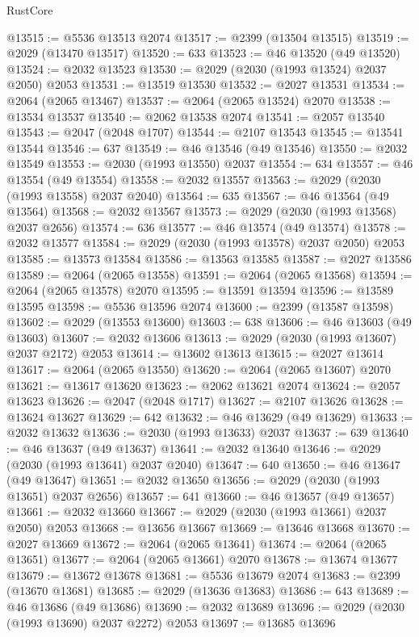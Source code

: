 \begin{lexlean}{RustCore}
\begin{coremodule}
@13515 := @5536 @13513 @2074
@13517 := @2399 (@13504 @13515)
@13519 := @2029 (@13470 @13517)
@13520 := 633
@13523 := @46 @13520 (@49 @13520)
@13524 := @2032 @13523
@13530 := @2029 (@2030 (@1993 @13524) @2037 @2050) @2053
@13531 := @13519 @13530
@13532 := @2027 @13531
@13534 := @2064 (@2065 @13467)
@13537 := @2064 (@2065 @13524) @2070
@13538 := @13534 @13537
@13540 := @2062 @13538 @2074
@13541 := @2057 @13540
@13543 := @2047 (@2048 @1707)
@13544 := @2107 @13543
@13545 := @13541 @13544
@13546 := 637
@13549 := @46 @13546 (@49 @13546)
@13550 := @2032 @13549
@13553 := @2030 (@1993 @13550) @2037
@13554 := 634
@13557 := @46 @13554 (@49 @13554)
@13558 := @2032 @13557
@13563 := @2029 (@2030 (@1993 @13558) @2037 @2040)
@13564 := 635
@13567 := @46 @13564 (@49 @13564)
@13568 := @2032 @13567
@13573 := @2029 (@2030 (@1993 @13568) @2037 @2656)
@13574 := 636
@13577 := @46 @13574 (@49 @13574)
@13578 := @2032 @13577
@13584 := @2029 (@2030 (@1993 @13578) @2037 @2050) @2053
@13585 := @13573 @13584
@13586 := @13563 @13585
@13587 := @2027 @13586
@13589 := @2064 (@2065 @13558)
@13591 := @2064 (@2065 @13568)
@13594 := @2064 (@2065 @13578) @2070
@13595 := @13591 @13594
@13596 := @13589 @13595
@13598 := @5536 @13596 @2074
@13600 := @2399 (@13587 @13598)
@13602 := @2029 (@13553 @13600)
@13603 := 638
@13606 := @46 @13603 (@49 @13603)
@13607 := @2032 @13606
@13613 := @2029 (@2030 (@1993 @13607) @2037 @2172) @2053
@13614 := @13602 @13613
@13615 := @2027 @13614
@13617 := @2064 (@2065 @13550)
@13620 := @2064 (@2065 @13607) @2070
@13621 := @13617 @13620
@13623 := @2062 @13621 @2074
@13624 := @2057 @13623
@13626 := @2047 (@2048 @1717)
@13627 := @2107 @13626
@13628 := @13624 @13627
@13629 := 642
@13632 := @46 @13629 (@49 @13629)
@13633 := @2032 @13632
@13636 := @2030 (@1993 @13633) @2037
@13637 := 639
@13640 := @46 @13637 (@49 @13637)
@13641 := @2032 @13640
@13646 := @2029 (@2030 (@1993 @13641) @2037 @2040)
@13647 := 640
@13650 := @46 @13647 (@49 @13647)
@13651 := @2032 @13650
@13656 := @2029 (@2030 (@1993 @13651) @2037 @2656)
@13657 := 641
@13660 := @46 @13657 (@49 @13657)
@13661 := @2032 @13660
@13667 := @2029 (@2030 (@1993 @13661) @2037 @2050) @2053
@13668 := @13656 @13667
@13669 := @13646 @13668
@13670 := @2027 @13669
@13672 := @2064 (@2065 @13641)
@13674 := @2064 (@2065 @13651)
@13677 := @2064 (@2065 @13661) @2070
@13678 := @13674 @13677
@13679 := @13672 @13678
@13681 := @5536 @13679 @2074
@13683 := @2399 (@13670 @13681)
@13685 := @2029 (@13636 @13683)
@13686 := 643
@13689 := @46 @13686 (@49 @13686)
@13690 := @2032 @13689
@13696 := @2029 (@2030 (@1993 @13690) @2037 @2272) @2053
@13697 := @13685 @13696

\end{coremodule}
\end{lexlean}
